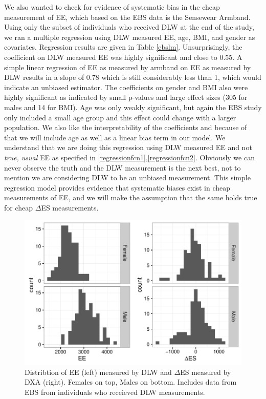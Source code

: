 \documentclass[11pt]{article}\usepackage[]{graphicx}\usepackage[]{color}
\makeatletter
\def\maxwidth{ %
  \ifdim\Gin@nat@width>\linewidth
    \linewidth
  \else
    \Gin@nat@width
  \fi
}
\newenvironment{knitrout}{}{} %
\makeatother
\begin{document}
We also wanted to check for evidence of systematic bias in the cheap measurement of EE, which based on the EBS data is the Sensewear Armband. Using only the subset of individuals who received DLW at the end of the study, we ran a multiple regression using DLW measured EE, age, BMI, and gender as covariates. Regression results are given in Table \eqref{ebslm}. Unsurprisingly, the coefficient on DLW measured EE was highly significant and close to 0.55. A simple linear regression of EE as measured by armband on EE as measured by DLW results in a slope of 0.78 which is still considerably less than 1, which would indicate an unbiased estimator. The coefficients on gender and BMI also were highly significant as indicated by small p-values and large effect sizes (305 for males and 14 for BMI). Age was only weakly significant, but again the EBS study only included a small age group and this effect could change with a larger population. We also like the interpretability of the coefficients and because of that we will include age as well as a linear bias term in our model. We understand that we are doing this regression using DLW measured EE and not \emph{true, usual} EE as specified in \eqref{regressionfcn1},\eqref{regressionfcn2}. Obviously we can never observe the truth and the DLW measurement is the next best, not to mention we are considering DLW to be an unbiased measurement. This simple regression model provides evidence that systematic biases exist in cheap measurements of EE, and we will make the assumption that the same holds true for cheap $\Delta$ES measurements.

\begin{knitrout}
\color{fgcolor}\begin{figure}

{\centering \includegraphics[width=\maxwidth]{figure/ebsw-1} 

}

\caption[Distribtion of EE (left) measured by DLW and ]{Distribtion of EE (left) measured by DLW and $\Delta$ES measured by DXA (right). Females on top, Males on bottom. Includes data from EBS from individuals who receieved DLW measurements.}\label{fig:ebsw}
\end{figure}


\end{knitrout}
\end{document}

